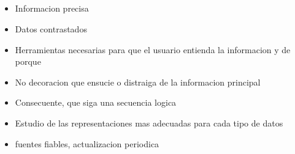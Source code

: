 \subsection*{}
\begin{itemize}

    \item Informacion precisa
    \item Datos contrastados
    \item Herramientas necesarias para que el usuario entienda la informacion y de porque
    \item No decoracion que ensucie o distraiga de la informacion principal
    \item Consecuente, que siga una secuencia logica
    \item Estudio de las representaciones mas adecuadas para cada tipo de datos
    \item fuentes fiables, actualizacion periodica
\end{itemize}